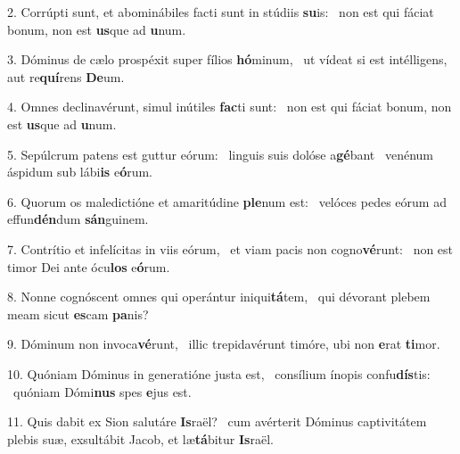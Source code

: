 2. Corrúpti sunt, et abominábiles facti sunt in stúdiis \textbf{su}is: \ast\  non est qui fáciat bonum, non est \textbf{us}que ad \textbf{u}num.\

3. Dóminus de cælo prospéxit super fílios \textbf{hó}minum, \ast\  ut vídeat si est intélligens, aut re\textbf{quí}rens \textbf{De}um.\

4. Omnes declinavérunt, simul inútiles \textbf{fac}ti sunt: \ast\  non est qui fáciat bonum, non est \textbf{us}que ad \textbf{u}num.\

5. Sepúlcrum patens est guttur eórum: \dag\  linguis suis dolóse a\textbf{gé}bant \ast\  venénum áspidum sub lábi\textbf{is} e\textbf{ó}rum.\

6. Quorum os maledictióne et amaritúdine \textbf{ple}num est: \ast\  velóces pedes eórum ad effun\textbf{dén}dum \textbf{sán}guinem.\

7. Contrítio et infelícitas in viis eórum, \dag\  et viam pacis non cogno\textbf{vé}runt: \ast\  non est timor Dei ante ócu\textbf{los} e\textbf{ó}rum.\

8. Nonne cognóscent omnes qui operántur iniqui\textbf{tá}tem, \ast\  qui dévorant plebem meam sicut \textbf{es}cam \textbf{pa}nis?\

9. Dóminum non invoca\textbf{vé}runt, \ast\  illic trepidavérunt timóre, ubi non \textbf{e}rat \textbf{ti}mor.\

10. Quóniam Dóminus in generatióne justa est, \dag\  consílium ínopis confu\textbf{dís}tis: \ast\  quóniam Dómi\textbf{nus} spes \textbf{e}jus est.\

11. Quis dabit ex Sion salutáre \textbf{Is}raël? \ast\  cum avérterit Dóminus captivitátem plebis suæ, exsultábit Jacob, et læ\textbf{tá}bitur \textbf{Is}raël.\

